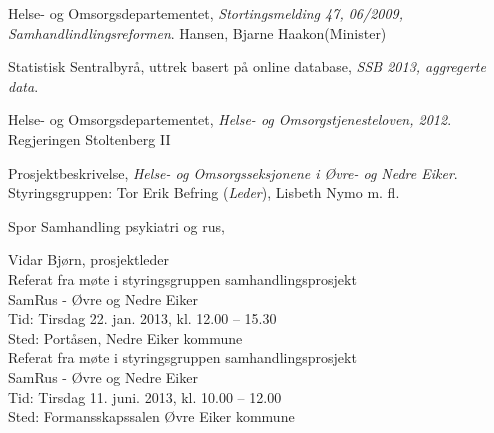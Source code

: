 \documentclass[11pt]{report} %
\begin{document}
              \renewcommand{\bibname}{Kilder:}
              \begin{thebibliography}{99}

                  Helse- og Omsorgsdepartementet,
                  \emph{Stortingsmelding 47, 06/2009, Samhandlindlingsreformen}.
                  Hansen, Bjarne Haakon(Minister)

                  Statistisk Sentralbyrå, uttrek basert på online database,
                  \emph{SSB 2013, aggregerte data}.

                  Helse- og Omsorgsdepartementet,
                  \emph{Helse- og Omsorgstjenesteloven, 2012}.
                  Regjeringen Stoltenberg II

                  Prosjektbeskrivelse,
                  \emph{Helse- og Omsorgsseksjonene i Øvre- og Nedre Eiker}.
                  Styringsgruppen: Tor Erik Befring (\emph{Leder}), Lisbeth Nymo m. fl.

                  Spor Samhandling psykiatri og rus,
                  Vidar Bjørn, prosjektleder \href{mailto:vibjoe@siv.no}{}\\

                  Referat fra møte i styringsgruppen samhandlingsprosjekt\\ 
                  SamRus - Øvre og Nedre Eiker\\
                  Tid: Tirsdag 22. jan. 2013,  kl. 12.00 – 15.30\\
                  Sted: Portåsen, Nedre Eiker kommune\\

                  Referat fra møte i styringsgruppen samhandlingsprosjekt\\ 
                  SamRus - Øvre og Nedre Eiker\\
                  Tid: Tirsdag 11. juni. 2013,  kl. 10.00 – 12.00\\
                  Sted: Formansskapssalen Øvre Eiker kommune\\


\end{thebibliography}
\end{document}
